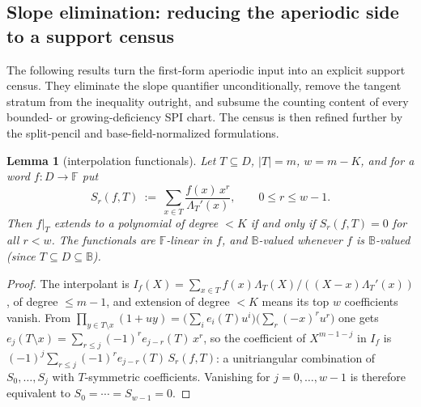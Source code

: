 \documentclass[11pt]{article}
\newtheorem{lemma}[lemma]{Lemma}
\theoremstyle{definition}
\theoremstyle{remark}
\newcommand{\F}{\mathbb{F}}
\newcommand{\B}{\mathbb{B}}
\begin{document}
\subsection{Slope elimination: reducing the aperiodic side to a support census}

The following results turn the first-form aperiodic input into an explicit support census.  They eliminate the slope quantifier unconditionally, remove the tangent stratum from the inequality outright, and subsume the counting content of every bounded- or growing-deficiency SPI chart.  The census is then refined further by the split-pencil and base-field-normalized formulations.

\begin{lemma}[interpolation functionals]\label{lem:capfp-functionals}
Let $T\subseteq D$, $|T|=m$, $w=m-K$, and for a word $f:D\to\F$ put
\[
        S_r(f,T)\ :=\ \sum_{x\in T}\frac{f(x)\,x^r}{\Lambda_T'(x)},\qquad 0\le r\le w-1 .
\]
Then $f|_T$ extends to a polynomial of degree $<K$ if and only if $S_r(f,T)=0$ for all $r<w$.  The functionals are $\F$-linear in $f$, and $\B$-valued whenever $f$ is $\B$-valued \textup(since $T\subseteq D\subseteq\B$\textup).
\end{lemma}

\begin{proof}
The interpolant is $I_f(X)=\sum_{x\in T}f(x)\Lambda_T(X)/((X-x)\Lambda_T'(x))$, of degree $\le m-1$, and extension of degree $<K$ means its top $w$ coefficients vanish.  From $\prod_{y\in T\setminus x}(1+uy)=\bigl(\sum_ie_i(T)u^i\bigr)\bigl(\sum_r(-x)^ru^r\bigr)$ one gets $e_j(T\setminus x)=\sum_{r\le j}(-1)^re_{j-r}(T)\,x^r$, so the coefficient of $X^{m-1-j}$ in $I_f$ is $(-1)^j\sum_{r\le j}(-1)^re_{j-r}(T)\,S_r(f,T)$: a unitriangular combination of $S_0,\ldots,S_j$ with $T$-symmetric coefficients.  Vanishing for $j=0,\ldots,w-1$ is therefore equivalent to $S_0=\cdots=S_{w-1}=0$.
\end{proof}
\end{document}
